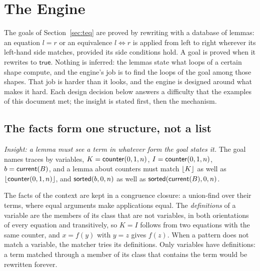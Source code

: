 \section{The Engine}\label{sec:engine}

The goals of Section~\ref{sec:teq} are proved by rewriting with a database of lemmas: an equation
$l = r$ or an equivalence $l \Leftrightarrow r$ is applied from left to right wherever its left-hand side
matches, provided its side conditions hold. A goal is proved when it rewrites to $\mathsf{true}$. Nothing is
inferred: the lemmas state what loops of a certain shape compute, and the engine's job is to find the loops
of the goal among those shapes. That job is harder than it looks, and the engine is designed around what
makes it hard. Each design decision below answers a difficulty that the examples of this document met; the
insight is stated first, then the mechanism.

\subsection{The facts form one structure, not a list}\label{sec:engine:classes}
\emph{Insight: a lemma must see a term in whatever form the goal states it.} The goal names traces by
variables, $K = \mathsf{counter}(0, 1, n)$, $I = \mathsf{counter}(0, 1, n)$, $b = \mathsf{current}(B)$, and a lemma about counters must match $\lfloor K\rfloor$
as well as $\lfloor \mathsf{counter}(0, 1, n)\rfloor$, and $\mathsf{sorted}(b, 0, n)$ as well as $\mathsf{sorted}(\mathsf{current}(B), 0, n)$.

The facts of the context are kept in a congruence closure: a union-find over their terms, where equal
arguments make applications equal. The \emph{definitions} of a variable are the members of its class that are
not variables, in both orientations of every equation and transitively, so $K = I$ follows from two equations
with the same counter, and $x = f(y)$ with $y = z$ gives $f(z)$. When a pattern does not match a variable, the
matcher tries its definitions. Only variables have definitions: a term matched through a member of its class
that contains the term would be rewritten forever.

